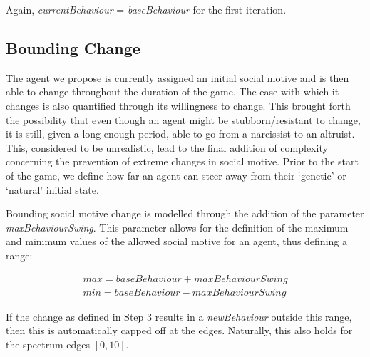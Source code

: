Again, \textit{currentBehaviour} = \textit{baseBehaviour} for the first iteration.

\subsection{Bounding Change}
The agent we propose is currently assigned an initial social motive and is then able to change throughout the duration of the game. The ease with which it changes is also quantified through its willingness to change. This brought forth the possibility that even though an agent might be stubborn/resistant to change, it is still, given a long enough period, able to go from a narcissist to an altruist. This, considered to be unrealistic, lead to the final addition of complexity concerning the prevention of extreme changes in social motive. Prior to the start of the game, we define how far an agent can steer away from their `genetic' or `natural' initial state.

Bounding social motive change is modelled through the addition of the parameter \textit{maxBehaviourSwing}. This parameter allows for the definition of the maximum and minimum values of the allowed social motive for an agent, thus defining a range:

\vspace{0.2cm}
\begin{equation}
    \begin{gathered}
    \mathit{max = baseBehaviour + maxBehaviourSwing}  \\
    \mathit{min = baseBehaviour - maxBehaviourSwing}
    \end{gathered}
\end{equation}
\vspace{0.2cm}

If the change as defined in Step 3 results in a \textit{newBehaviour} outside this range, then this is automatically capped off at the edges. Naturally, this also holds for the spectrum edges $[0,10]$.








